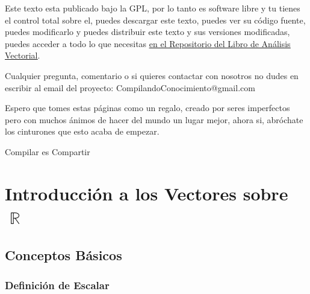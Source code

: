 \documentclass[12pt, fleqn]{report}                             %
\theoremstyle{break}                                            %
\DeclareMathOperator \Reals        {\mathbb{R}}                 %
\begin{document}
    Este texto esta publicado bajo la GPL, por lo tanto es software libre y tu tienes el control total sobre
    el, puedes descargar este texto, puedes ver su código fuente, puedes modificarlo y puedes distribuir este
    texto y sus versiones modificadas, puedes acceder a todo lo que necesitas 
    \href{http://www.github.com/CompilandoConocimiento/LibroAnalisisVectorial}
    {\underline{en el Repositorio del Libro de Análisis Vectorial}}. 

    Cualquier pregunta, comentario o si quieres contactar con nosotros no dudes en escribir al email del proyecto:
    CompilandoConocimiento@gmail.com

    Espero que tomes estas páginas como un regalo, creado por seres imperfectos pero con muchos ánimos de hacer
    del mundo un lugar mejor, ahora si, abróchate los cinturones que esto acaba de empezar.

    \begin{flushright}
        Compilar es Compartir
    \end{flushright}






\part{Introducción a los Vectores sobre $\Reals$}



    \chapter{Conceptos Básicos}
    

        \clearpage
        \section{Definición de Escalar}
\end{document}
